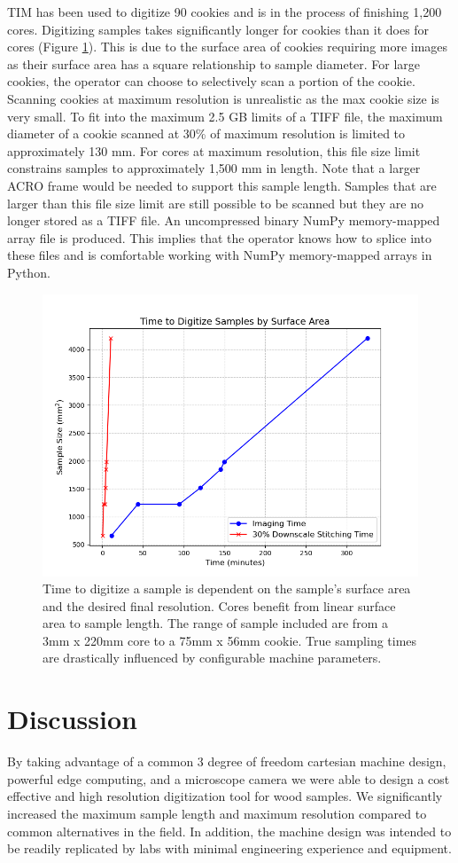\documentclass[a4paper,12pt]{article}
\begin{document}
TIM has been used to digitize 90 cookies and is in the process of finishing 1,200 cores. 
Digitizing samples takes significantly longer for cookies than it does for cores (Figure \ref{fig:digitization_time}). This is due to the surface area of cookies requiring more images as their surface area has a square relationship to sample diameter.
For large cookies, the operator can choose to selectively scan a portion of the cookie. Scanning cookies at maximum resolution is unrealistic as the max cookie size is very small. 
To fit into the maximum 2.5 GB limits of a TIFF file, the maximum diameter of a cookie scanned at 30\% of maximum resolution is limited to approximately 130 mm. For cores at maximum resolution, this file size limit 
constrains samples to approximately 1,500 mm in length. Note that a larger ACRO frame would be needed to support this sample length. Samples that are larger than this file size limit are still possible to be scanned but they are no longer stored as a TIFF file. 
An uncompressed binary NumPy memory-mapped array file is produced. This implies that the operator knows how to splice into these files and is comfortable working with NumPy memory-mapped arrays in Python.

\begin{figure}
    \centering
    \includegraphics[height=0.5\linewidth]{../../code/plots/time_and_area.png}
    \caption{Time to digitize a sample is dependent on the sample's surface area and the desired final resolution.
    Cores benefit from linear surface area to sample length. The range of sample included are from a 3mm x 220mm core to a 75mm x 56mm cookie. True sampling times are drastically influenced by configurable machine parameters.}
    \label{fig:digitization_time}
\end{figure}

\section{Discussion}
By taking advantage of a common 3 degree of freedom cartesian machine design, powerful edge computing, and a microscope camera we were able to design a cost effective and high resolution digitization tool for wood samples. 
We significantly increased the maximum sample length and maximum resolution compared to common alternatives in the field. 
In addition, the machine design was intended to be readily replicated by labs with minimal engineering experience and equipment. 
\end{document}
